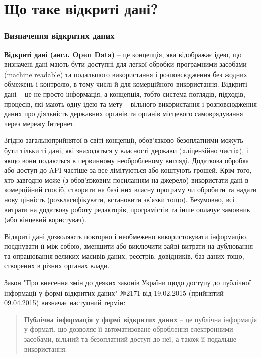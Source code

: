 \chapter{Що таке відкриті дані?}

\subsection{Визначення відкритих даних}

\textbf{Відкриті дані (англ. Open Data)} – це концепція, яка відображає ідею, що визначені дані мають бути доступні для легкої обробки програмними засобами (machine readable) та подальшого використання і розповсюдження без жодних обмежень і контролю, в тому числі й для комерційного використання. Відкриті дані – це не просто інформація, а концепція, тобто система поглядів, підходів, процесів, які мають одну ідею та мету – вільного використання і розповсюдження даних про діяльність державних органів та органів місцевого самоврядування через мережу Інтернет.

Згідно загальноприйнятої в світі концепції, обов’язково безоплатними можуть бути тільки ті дані, які знаходяться у власності держави («ліцензійно чисті»), і якщо вони подаються в первинному необробленому вигляді. Додаткова обробка або доступ до API частіше за все лімітуються або коштують грошей. Крім того, хто завгодно може (з обов’язковим посиланням на джерело) використати дані в комерційний спосіб, створити на базі них власну програму чи обробити та надати нову цінність (розкласифікувати, встановити зв’язки тощо). Безумовно, всі витрати на додаткову роботу редакторів, програмістів та інше оплачує замовник (або кінцевий користувач).

Відкриті дані дозволяють повторно і необмежено використовувати інформацію, поєднувати її між собою, зменшити або виключити зайві витрати на дублювання та опрацювання великих масивів даних, реєстрів, довідників, баз даних тощо, створених в різних органах влади.

Закон "Про внесення змін до деяких законів України щодо доступу до публічної інформації у формі відкритих даних" №2171 від 19.02.2015 (прийнятий 09.04.2015) визначає наступний термін:

\begin{quote}
\textbf{Публічна інформація у формі відкритих даних} – це публічна інформація у форматі, що дозволяє її автоматизоване оброблення електронними засобами, вільний та безоплатний доступ до неї, а також її подальше використання.
\end{quote}

